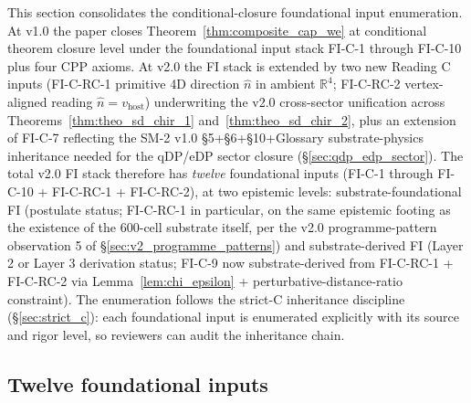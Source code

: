 \documentclass[11pt,letterpaper]{article}
\begin{document}
This section consolidates the conditional-closure foundational input enumeration. At v1.0 the paper closes Theorem~\ref{thm:composite_cap_we} at conditional theorem closure level under the foundational input stack FI-C-1 through FI-C-10 plus four CPP axioms. At v2.0 the FI stack is extended by two new Reading C inputs (FI-C-RC-1 primitive 4D direction $\hat{n}$ in ambient $\mathbb{R}^4$; FI-C-RC-2 vertex-aligned reading $\hat{n} = v_{\text{host}}$) underwriting the v2.0 cross-sector unification across Theorems~\ref{thm:theo_sd_chir_1} and~\ref{thm:theo_sd_chir_2}, plus an extension of FI-C-7 reflecting the SM-2 v1.0 \S5+\S6+\S10+Glossary substrate-physics inheritance needed for the qDP/eDP sector closure (\S\ref{sec:qdp_edp_sector}). The total v2.0 FI stack therefore has \emph{twelve} foundational inputs (FI-C-1 through FI-C-10 + FI-C-RC-1 + FI-C-RC-2), at two epistemic levels: substrate-foundational FI (postulate status; FI-C-RC-1 in particular, on the same epistemic footing as the existence of the 600-cell substrate itself, per the v2.0 programme-pattern observation 5 of \S\ref{sec:v2_programme_patterns}) and substrate-derived FI (Layer 2 or Layer 3 derivation status; FI-C-9 now substrate-derived from FI-C-RC-1 + FI-C-RC-2 via Lemma~\ref{lem:chi_epsilon} + perturbative-distance-ratio constraint). The enumeration follows the strict-C inheritance discipline (\S\ref{sec:strict_c}): each foundational input is enumerated explicitly with its source and rigor level, so reviewers can audit the inheritance chain.

\subsection{Twelve foundational inputs}\label{sec:ten_fis}
\end{document}
